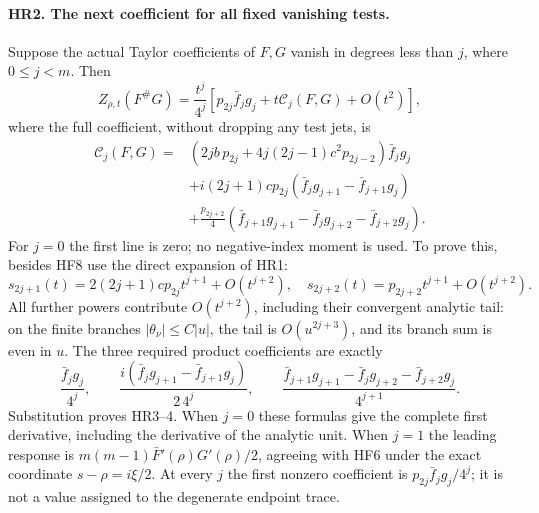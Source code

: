 \documentclass[11pt,a4paper]{article}
\theoremstyle{definition}\newtheorem{definition}[theorem]{Definition}
\begin{document}
\paragraph{HR2. The next coefficient for all fixed vanishing tests.}
Suppose the actual Taylor coefficients of $F,G$ vanish in degrees
less than $j$, where $0\le j<m$. Then
\[
 Z_{\rho,t}(F^\#G)=\frac{t^j}{4^j}
       \left[p_{2j}\bar f_j g_j+t\mathcal C_j(F,G)+O(t^2)\right],
 \tag{HR3}
\]
where the full coefficient, without dropping any test jets, is
\[
\begin{split}
 \mathcal C_j(F,G)={}&
 \left(2jb\,p_{2j}+4j(2j-1)c^2p_{2j-2}\right)\bar f_j g_j\\
 &+i(2j+1)c p_{2j}
       (\bar f_j g_{j+1}-\bar f_{j+1}g_j)\\
 &+\frac{p_{2j+2}}4
       (\bar f_{j+1}g_{j+1}-\bar f_jg_{j+2}-\bar f_{j+2}g_j).
\end{split}
 \tag{HR4}
\]
For $j=0$ the first line is zero; no negative-index moment is used.
To prove this, besides HF8 use the direct expansion of HR1:
\[
 s_{2j+1}(t)=2(2j+1)c p_{2j}t^{j+1}+O(t^{j+2}),\quad
 s_{2j+2}(t)=p_{2j+2}t^{j+1}+O(t^{j+2}).
 \tag{HR5}
\]
All further powers contribute $O(t^{j+2})$, including their
convergent analytic tail: on the finite branches $|\theta_\nu|\le C|u|$,
the tail is $O(u^{2j+3})$, and its branch sum is even in $u$.
The three required product coefficients are exactly
\[
 \frac{\bar f_jg_j}{4^j},\qquad
 \frac{i(\bar f_jg_{j+1}-\bar f_{j+1}g_j)}{2\,4^j},\qquad
 \frac{\bar f_{j+1}g_{j+1}-\bar f_jg_{j+2}-\bar f_{j+2}g_j}{4^{j+1}}.
 \tag{HR6}
\]
Substitution proves HR3--4. When $j=0$ these formulas give the
complete first derivative, including the derivative of the analytic
unit. When $j=1$ the leading response is
$m(m-1)\bar F'(\rho)G'(\rho)/2$, agreeing with HF6 under the exact
coordinate $s-\rho=i\xi/2$. At every $j$ the first nonzero
coefficient is $p_{2j}\bar f_jg_j/4^j$; it is not a value assigned
to the degenerate endpoint trace.
\end{document}
